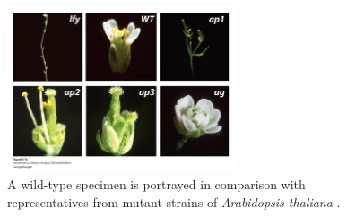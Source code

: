 \begin{figure}
\centering
\includegraphics[width=0.6\textwidth]{img/arabidopsis_mutations}
\caption{A wild-type specimen is portrayed in comparison with representatives from mutant strains of \textit{Arabidopsis thaliana} \cite{Griffiths2015IntroductionAnalysis}.} 
\label{fig:arabidopsis_mutants}
\end{figure}
